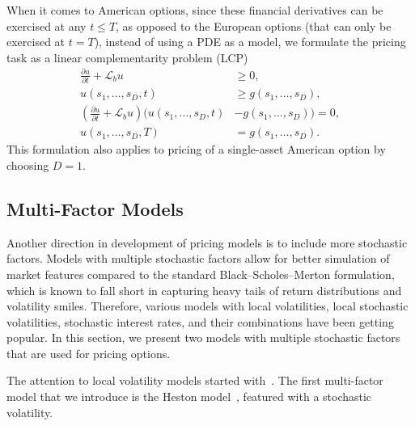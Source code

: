 \documentclass{UUThesisTemplate}
\begin{document}
\par
When it comes to American options, since these financial derivatives can be exercised at any $t \leq T$, as opposed to the European options (that can only be exercised at $t=T$), instead of using a PDE as a model, we formulate the pricing task as a linear complementarity problem (LCP)
\begin{align}
\frac{\partial u}{\partial t}+\mathcal{L}_b u&\geq 0,\nonumber \\
u(s_1,\ldots, s_D,t)&\geq g(s_1,\ldots, s_D), \nonumber \\
\left( \frac{\partial u}{\partial t}+\mathcal{L}_b u\right) \big(u(s_1,\ldots, s_D,t) &-g(s_1,\ldots, s_D)\big)=0, \nonumber \\ 
u(s_1,\ldots,s_D,T)&=g(s_1,\ldots,s_D). \label{eqlcp}
\end{align}
This formulation also applies to pricing of a single-asset American option by choosing $D=1$. 
%



%
\subsection{Multi-Factor Models}
\label{sub:multifactor}

\par
Another direction in development of pricing models is to include more stochastic factors. Models with multiple stochastic factors allow for better simulation of market features compared to the standard Black--Scholes--Merton formulation, which is known to fall short in capturing heavy tails of return distributions and volatility smiles. Therefore, various models with local volatilities, local stochastic volatilities, stochastic interest rates, and their combinations have been getting popular. In this section, we present two models with multiple stochastic factors that are used for pricing options.

\par
The attention to local volatility models started with~\cite{dupire1994pricing}. The first multi-factor model that we introduce is the Heston model~\cite{heston1993closed}, featured with a stochastic volatility. 
\end{document}
